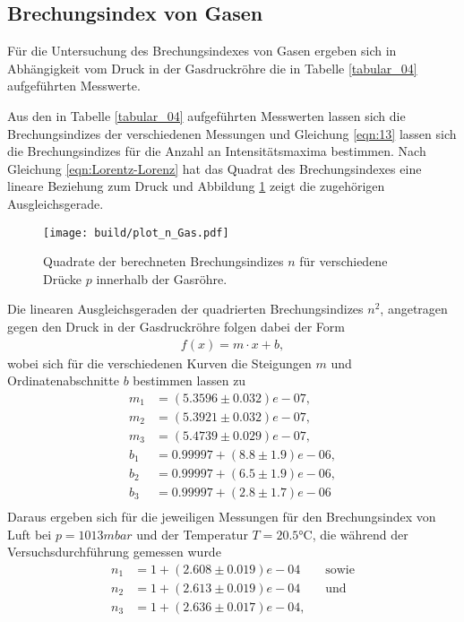 \subsection{Brechungsindex von Gasen}
\noindent Für die Untersuchung des Brechungsindexes von Gasen ergeben sich in
Abhängigkeit vom Druck in der Gasdruckröhre die in Tabelle \ref{tabular_04}
aufgeführten Messwerte. \\
\FloatBarrier

\FloatBarrier
\noindent Aus den in Tabelle \ref{tabular_04} aufgeführten Messwerten lassen sich
die Brechungsindizes der verschiedenen Messungen und Gleichung \ref{eqn:13}
lassen sich die Brechungsindizes für die Anzahl an Intensitätsmaxima bestimmen.
Nach Gleichung \ref{eqn:Lorentz-Lorenz} hat das Quadrat des Brechungsindexes eine lineare Beziehung zum Druck
und Abbildung \ref{fig:03} zeigt die zugehörigen Ausgleichsgerade. \\
\FloatBarrier
\begin{figure}
  \centering
  \texttt{[image: build/plot\_n\_Gas.pdf]}
  \caption{Quadrate der berechneten Brechungsindizes $n$ für verschiedene Drücke
  $p$ innerhalb der Gasröhre.}
  \label{fig:03}
\end{figure}
\FloatBarrier
\noindent Die linearen Ausgleichsgeraden der quadrierten Brechungsindizes $n^2$,
angetragen gegen den Druck in der Gasdruckröhre folgen dabei der Form
\begin{align}
  f(x) = m \cdot x + b,
\end{align}
wobei sich für die verschiedenen Kurven die Steigungen $m$ und Ordinatenabschnitte
$b$ bestimmen lassen zu
\begin{align*}
  m_1 &= (5.3596 \pm 0.032)e-07, \\
  m_2 &= (5.3921 \pm 0.032)e-07, \\
  m_3 &= (5.4739 \pm 0.029)e-07, \\
  b_1 &= 0.99997 + (8.8 \pm 1.9)e-06, \\
  b_2 &= 0.99997 + (6.5 \pm 1.9)e-06, \\
  b_3 &= 0.99997 + (2.8 \pm 1.7)e-06 \\
\end{align*}
\noindent Daraus ergeben sich für die jeweiligen Messungen für den Brechungsindex
von Luft bei $p = 1013\si{mbar}$ und der Temperatur $T = 20.5\si{\celsius}$, die während der Versuchsdurchführung gemessen wurde
\begin{align}
  n_1 &= 1 + (2.608 \pm 0.019)e-04 \qquad \text{sowie} \\
  n_2 &= 1 + (2.613 \pm 0.019)e-04  \qquad \text{und} \\
  n_3 &= 1 + (2.636 \pm 0.017)e-04, \\
\end{align}
